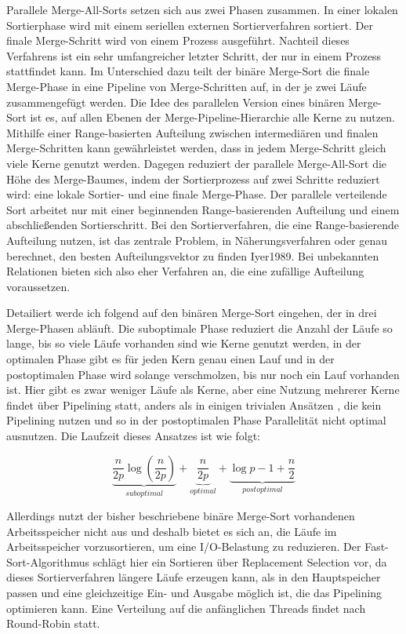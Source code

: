 \documentclass[a4paper,12pt,twoside]{article}
\begin{document}
Parallele Merge-All-Sorts {\autocite[S. 831f]{Taniar2000}} setzen sich aus zwei Phasen zusammen. In einer lokalen Sortierphase wird mit einem seriellen externen Sortierverfahren sortiert. Der finale Merge-Schritt wird von einem Prozess ausgeführt. Nachteil dieses Verfahrens ist ein sehr umfangreicher letzter Schritt, der nur in einem Prozess stattfindet kann. Im Unterschied dazu teilt der binäre Merge-Sort {\autocite[S. 832f]{Taniar2000}} die finale Merge-Phase in eine Pipeline von Merge-Schritten auf, in der je zwei Läufe zusammengefügt werden. Die Idee des parallelen Version eines binären Merge-Sort {\autocite[S. 833]{Taniar2000}} ist es, auf allen Ebenen der Merge-Pipeline-Hierarchie alle Kerne zu nutzen. Mithilfe einer Range-basierten Aufteilung zwischen intermediären und finalen Merge-Schritten kann gewährleistet werden, dass in jedem Merge-Schritt gleich viele Kerne genutzt werden. Dagegen reduziert der parallele Merge-All-Sort {\autocite[S. 833f]{Taniar2000}} die Höhe des Merge-Baumes, indem der Sortierprozess auf zwei Schritte reduziert wird: eine lokale Sortier- und eine finale Merge-Phase. Der parallele verteilende Sort arbeitet nur mit einer beginnenden Range-basierenden Aufteilung und einem abschließenden Sortierschritt. Bei den Sortierverfahren, die eine Range-basierende Aufteilung nutzen, ist das zentrale Problem, in Näherungsverfahren oder genau berechnet, den besten Aufteilungsvektor zu finden {\autocite{Lu1994}{Iyer1989}}. Bei unbekannten Relationen bieten sich also eher Verfahren an, die eine zufällige Aufteilung voraussetzen.

Detailiert werde ich {\textcite[S. 333ff]{Bitton1983}} folgend auf den binären Merge-Sort eingehen, der in drei Merge-Phasen abläuft. Die suboptimale Phase reduziert die Anzahl der Läufe so lange, bis so viele Läufe vorhanden sind wie Kerne genutzt werden, in der optimalen Phase gibt es für jeden Kern genau einen Lauf und in der postoptimalen Phase wird solange verschmolzen, bis nur noch ein Lauf vorhanden ist. Hier gibt es zwar weniger Läufe als Kerne, aber eine Nutzung mehrerer Kerne findet über Pipelining statt, anders als in einigen trivialen Ansätzen {\autocite{Yu1998}}, die kein Pipelining nutzen und so in der postoptimalen Phase Parallelität nicht optimal ausnutzen. Die Laufzeit dieses Ansatzes ist wie folgt:

\[ \underbrace{\frac{n}{2p} \log \left( \frac{n}{2p} \right)}_{suboptimal} + \underbrace{\frac{n}{2p}}_{optimal} + \underbrace{\log p - 1 + \frac{n}{2}}_{postoptimal} \]

Allerdings nutzt der bisher beschriebene binäre Merge-Sort vorhandenen Arbeitsspeicher nicht aus und deshalb bietet es sich an, die Läufe im Arbeitsspeicher vorzusortieren, um eine I/O-Belastung zu reduzieren. Der Fast-Sort-Algorithmus {\autocite{Tsukerman1986, Salzberg1990}} schlägt hier ein Sortieren über Replacement Selection {\autocite[vgl. ]{Knuth1973}} vor, da dieses Sortierverfahren längere Läufe erzeugen kann, als in den Hauptspeicher passen und eine gleichzeitige Ein- und Ausgabe möglich ist, die das Pipelining optimieren kann. Eine Verteilung auf die anfänglichen Threads findet nach Round-Robin statt.
\end{document}
